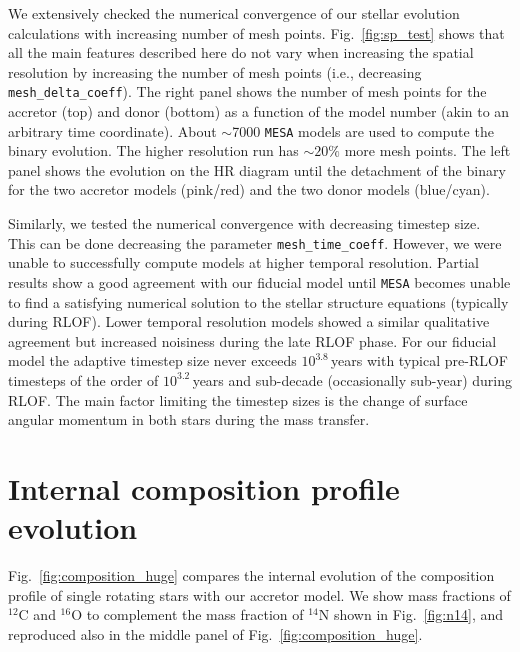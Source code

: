 \documentclass[twocolumn,twocolappendix,trackchanges]{aastex63}
\DeclareRobustCommand{\Figref}[1]{Fig.~\ref{#1}}
\begin{document}
We extensively checked the numerical convergence of our stellar
evolution calculations with increasing number of mesh
points. \Figref{fig:sp_test} shows that all the main features described
here do not vary when increasing the spatial resolution by increasing
the number of mesh points (i.e.,
decreasing \texttt{mesh\_delta\_coeff}). The right panel shows the
number of mesh points for the accretor (top) and donor (bottom) as a
function of the model number (akin to an arbitrary time
coordinate). About $\sim$7000 \texttt{MESA} models are used to compute
the binary evolution. The higher resolution run has $\sim 20\%$ more
mesh points. The left panel shows the evolution on the HR diagram until the
detachment of the binary for the two accretor models (pink/red) and
the two donor models (blue/cyan).

Similarly, we tested the numerical convergence with decreasing
timestep size. This can be done decreasing the parameter
\texttt{mesh\_time\_coeff}. However, we were unable to successfully
compute models at higher temporal resolution. Partial results show a
good agreement with our fiducial model until \texttt{MESA} becomes
unable to find a satisfying numerical solution to the stellar
structure equations (typically
during RLOF). Lower temporal resolution models showed a similar
qualitative agreement but increased noisiness during the late RLOF
phase. For our fiducial model the adaptive timestep size never exceeds
$10^{3.8}$\,years with typical pre-RLOF timesteps of the order of $10^{3.2}$\,years
and sub-decade (occasionally sub-year) during RLOF. The main factor limiting the timestep
sizes is the change of surface angular momentum in both stars during
the mass transfer.


\section{Internal composition profile evolution}
\label{sec:X_fig}


\Figref{fig:composition_huge} compares the internal evolution of the composition
profile of single rotating stars with our accretor model.
We show mass fractions of $^{12}\mathrm{C}$  and $^{16}\mathrm{O}$ to complement the
mass fraction of $^{14}\mathrm{N}$ shown in \Figref{fig:n14}, and
reproduced also in the middle panel of \Figref{fig:composition_huge}.
\end{document}
